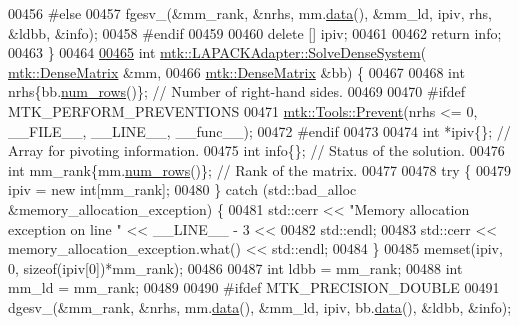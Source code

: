 \begin{DoxyCode}
00456 \textcolor{preprocessor}{  #else}
00457   fgesv\_(&mm\_rank, &nrhs, mm.\hyperlink{classmtk_1_1DenseMatrix_a0c33b8a9e01d157c61ddbdf807c25d84}{data}(), &mm\_ld, ipiv, rhs, &ldbb, &info);
00458 \textcolor{preprocessor}{  #endif}
00459 
00460   \textcolor{keyword}{delete} [] ipiv;
00461 
00462   \textcolor{keywordflow}{return} info;
00463 \}
00464 
\hypertarget{mtk__lapack__adapter_8cc_source_l00465}{}\hyperlink{classmtk_1_1LAPACKAdapter_af0723bba1d73450119d093b9cf1ff6f0}{00465} \textcolor{keywordtype}{int} \hyperlink{classmtk_1_1LAPACKAdapter_a7428bccf74fd4a4af68fb7233846da22}{mtk::LAPACKAdapter::SolveDenseSystem}(
      \hyperlink{classmtk_1_1DenseMatrix}{mtk::DenseMatrix} &mm,
00466                                          \hyperlink{classmtk_1_1DenseMatrix}{mtk::DenseMatrix} &bb) \{
00467 
00468   \textcolor{keywordtype}{int} nrhs\{bb.\hyperlink{classmtk_1_1DenseMatrix_a53f3afb3b6a8d21854458aaa9663cc74}{num\_rows}()\};  \textcolor{comment}{// Number of right-hand sides.}
00469 
00470 \textcolor{preprocessor}{  #ifdef MTK\_PERFORM\_PREVENTIONS}
00471   \hyperlink{classmtk_1_1Tools_a332324c6f25e66be9dff48c5987a3b9f}{mtk::Tools::Prevent}(nrhs <= 0, \_\_FILE\_\_, \_\_LINE\_\_, \_\_func\_\_);
00472 \textcolor{preprocessor}{  #endif}
00473 
00474   \textcolor{keywordtype}{int} *ipiv\{\};                \textcolor{comment}{// Array for pivoting information.}
00475   \textcolor{keywordtype}{int} info\{\};                 \textcolor{comment}{// Status of the solution.}
00476   \textcolor{keywordtype}{int} mm\_rank\{mm.\hyperlink{classmtk_1_1DenseMatrix_a53f3afb3b6a8d21854458aaa9663cc74}{num\_rows}()\}; \textcolor{comment}{// Rank of the matrix.}
00477 
00478   \textcolor{keywordflow}{try} \{
00479     ipiv = \textcolor{keyword}{new} \textcolor{keywordtype}{int}[mm\_rank];
00480   \} \textcolor{keywordflow}{catch} (std::bad\_alloc &memory\_allocation\_exception) \{
00481     std::cerr << \textcolor{stringliteral}{"Memory allocation exception on line "} << \_\_LINE\_\_ - 3 <<
00482       std::endl;
00483     std::cerr << memory\_allocation\_exception.what() << std::endl;
00484   \}
00485   memset(ipiv, 0, \textcolor{keyword}{sizeof}(ipiv[0])*mm\_rank);
00486 
00487   \textcolor{keywordtype}{int} ldbb = mm\_rank;
00488   \textcolor{keywordtype}{int} mm\_ld = mm\_rank;
00489 
00490 \textcolor{preprocessor}{  #ifdef MTK\_PRECISION\_DOUBLE}
00491   dgesv\_(&mm\_rank, &nrhs, mm.\hyperlink{classmtk_1_1DenseMatrix_a0c33b8a9e01d157c61ddbdf807c25d84}{data}(), &mm\_ld, ipiv, bb.\hyperlink{classmtk_1_1DenseMatrix_a0c33b8a9e01d157c61ddbdf807c25d84}{data}(), &ldbb, &info);

\end{DoxyCode}
